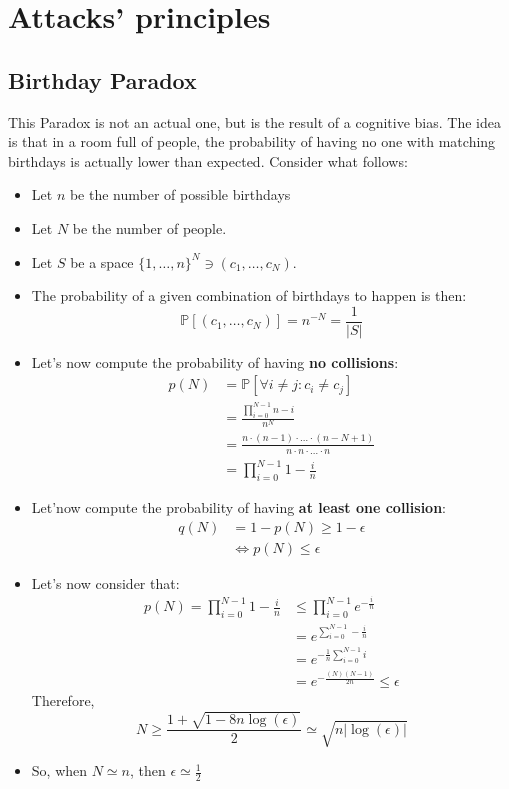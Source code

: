 \section{Attacks' principles}
\subsection{Birthday Paradox}
This Paradox is not an actual one, but is the result of a cognitive bias. \newline
The idea is that in a room full of people, the probability of having no one with matching birthdays is actually lower than expected.\newline
Consider what follows:
\begin{itemize}
    \item Let $n$ be the number of possible birthdays
    \item Let $N$ be the number of people.
    \item Let $S$ be a space $\{1, \dots, n\}^{N} \ni (c_{1}, \dots, c_{N})$.
    \item The probability of a given combination of birthdays to happen is then:
    \[
    \mathbb{P}[(c_{1}, \dots, c_{N})] = n^{-N} = \frac{1}{|S|}
    \]
    \item Let's now compute the probability of having \textbf{no collisions}:
    \begin{align*}
        p(N) &= \mathbb{P}[\forall i \neq j: c_{i} \neq c_{j}] \\
        &= \frac{\prod_{i=0}^{N-1} n - i}{n^{N}} \\
        &= \frac{n \cdot (n-1) \cdot \dots \cdot (n - N + 1)}{n \cdot n \cdot \dots \cdot n} \\
        &= \prod_{i=0}^{N-1} 1 - \frac{i}{n}
    \end{align*}
    \item Let'now compute the probability of having \textbf{at least one collision}:
    \begin{align*}
        q(N) &= 1 - p(N) \geq 1 - \epsilon \\
        & \iff p(N) \leq \epsilon
    \end{align*}
    \item Let's now consider that:
    \begin{align*}
        p(N) = \prod_{i=0}^{N-1} 1 - \frac{i}{n} &\leq \prod_{i=0}^{N-1} e^{-\frac{i}{n}}\\
        & = e^{\sum_{i=0}^{N-1}-\frac{i}{n}}\\
        & = e^{-\frac{1}{n}\sum_{i=0}^{N-1}i}\\
        & = e^{-\frac{(N)(N-1)}{2n}} \leq \epsilon
    \end{align*}
    Therefore,
    \[
        N \geq \frac{1+\sqrt{1 - 8n \operatorname{log}(\epsilon)}}{2} \simeq \sqrt{n |\operatorname{log}(\epsilon)|}
    \]
    \item So, when $N \simeq n$, then $\epsilon \simeq \frac{1}{2}$
\end{itemize}

